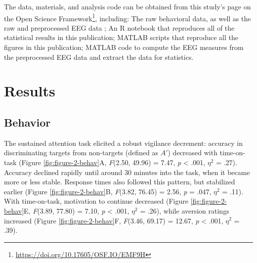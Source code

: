 \documentclass[11pt,]{memoir}
\let\rmarkdownfootnote\footnote%
\def\footnote{\protect\rmarkdownfootnote}
\renewcommand{\href}[2]{#2\footnote{\url{#1}}} %
\begin{document}
The data, materials, and analysis code can be obtained from this study's page on the \href{https://doi.org/10.17605/OSF.IO/EMF9H}{Open Science Framework}, including: The raw behavioral data, as well as the raw and preprocessed EEG data \autocite{Reteig2018a}; An R notebook \autocites{Xie2015}{R-knitr} that reproduces all of the statistical results in this publication; MATLAB scripts that reproduce all the figures in this publication; MATLAB code to compute the EEG measures from the preprocessed EEG data and extract the data for statistics.

\hypertarget{MFBrain-results}{%
\section{Results}\label{MFBrain-results}}

\hypertarget{behavior}{%
\subsection{Behavior}\label{behavior}}

The sustained attention task elicited a robust vigilance decrement: accuracy in discriminating targets from non-targets (defined as \(A'\)) decreased with time-on-task (Figure \ref{fig:figure-2-behav}A, \emph{F}(2.50, 49.96) = 7.47, \emph{p} \textless{} .001, \(\eta^2\) = .27). Accuracy declined rapidly until around 30 minutes into the task, when it became more or less stable. Response times also followed this pattern, but stabilized earlier (Figure \ref{fig:figure-2-behav}B, \emph{F}(3.82, 76.45) = 2.56, \emph{p} = .047, \(\eta^2\) = .11). With time-on-task, motivation to continue decreased (Figure \ref{fig:figure-2-behav}E, \emph{F}(3.89, 77.80) = 7.10, \emph{p} \textless{} .001, \(\eta^2\) = .26), while aversion ratings increased (Figure \ref{fig:figure-2-behav}F, \emph{F}(3.46, 69.17) = 12.67, \emph{p} \textless{} .001, \(\eta^2\) = .39).
\end{document}
